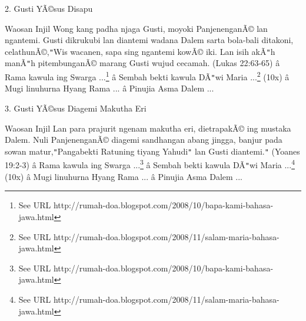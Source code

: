 
2. Gusti Y\~A\copyright{}sus Disapu

\newline


Waosan Injil
Wong kang padha njaga Gusti, moyoki Panjenengan\~A\copyright{} lan ngantemi. Gusti dikrukubi lan diantemi wadana Dalem sarta bola-bali ditakoni, celathun\~A\copyright{},\texttt{{}"{}}Wis wacanen, sapa sing ngantemi kow\~A\copyright{} iki. Lan isih ak\~A\texttt{{}"{}}h man\~A\texttt{{}"{}}h pitembungan\~A\copyright{} marang Gusti wujud cecamah. (Lukas 22:63-65)
\newline
 \^a\*  Rama kawula ing Swarga ...\footnote{See URL http://rumah-doa.blogspot.com/2008/10/bapa-kami-bahasa-jawa.html}\newline
 \^a\*  Sembah bekti kawula D\~A\texttt{{}"{}}wi Maria ...\footnote{See URL http://rumah-doa.blogspot.com/2008/11/salam-maria-bahasa-jawa.html} (10x)\newline
 \^a\*  Mugi linuhurna Hyang Rama ...\newline
 \^a\*  Pinujia Asma Dalem ...\newline


3. Gusti Y\~A\copyright{}sus Diagemi Makutha Eri

\newline


Waosan Injil
Lan para prajurit ngenam makutha eri, dietrapak\~A\copyright{} ing mustaka Dalem. Nuli Panjenengan\~A\copyright{} diagemi sandhangan abang jingga, banjur pada sowan matur,\texttt{{}"{}}Pangabekti Ratuning tiyang Yahudi\texttt{{}"{}} lan Gusti diantemi.\texttt{{}"{}} (Yoanes 19:2-3)
\newline
 \^a\*  Rama kawula ing Swarga ...\footnote{See URL http://rumah-doa.blogspot.com/2008/10/bapa-kami-bahasa-jawa.html}\newline
 \^a\*  Sembah bekti kawula D\~A\texttt{{}"{}}wi Maria ...\footnote{See URL http://rumah-doa.blogspot.com/2008/11/salam-maria-bahasa-jawa.html} (10x)\newline
 \^a\*  Mugi linuhurna Hyang Rama ...\newline
 \^a\*  Pinujia Asma Dalem ...\newline


